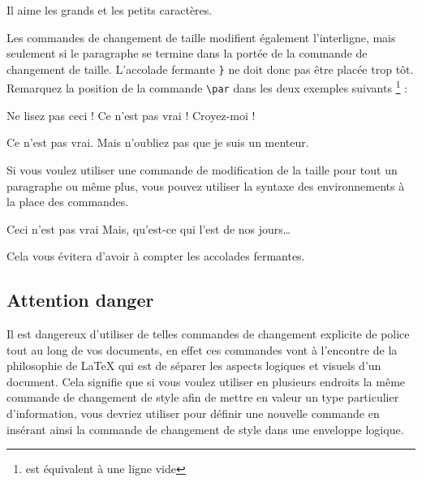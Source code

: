 \begin{example}
Il aime les  {\LARGE grands et
{\small les petits}
caractères}.
\end{example}

Les commandes de changement de taille modifient également
l'interligne, mais seulement si le paragraphe se termine dans la
portée de la commande de changement de taille. L'accolade fermante
\verb|}| ne
doit donc pas être placée trop tôt. Remarquez la position de la
commande \verb|\par| dans les deux exemples suivants
\footnote{ est équivalent à une ligne vide} :

\begin{example}
{\Large Ne lisez pas ceci !
 Ce n'est pas vrai !
 Croyez-moi !\par}
\end{example}
\begin{example}
{\Large Ce n'est pas vrai. Mais
n'oubliez pas que je suis un
menteur.}\par
\end{example}

Si vous voulez utiliser une commande de modification de la taille pour
tout un paragraphe ou même plus, vous pouvez utiliser la syntaxe des
environnements à la place des commandes.

\begin{example}
\begin{Large} \raggedright
Ceci n'est pas vrai
Mais, qu'est-ce qui l'est
de nos jours\dots\par
\end{Large}
\end{example}

\noindent Cela vous évitera d'avoir à compter les accolades
fermantes.

\subsection{Attention danger}

Il est dangereux d'utiliser de telles commandes de changement
explicite de police tout au long de vos documents, en effet ces
commandes vont à l'encontre de la philosophie de \LaTeX{} qui est de
séparer les aspects logiques et visuels d'un document. Cela signifie
que si vous voulez utiliser en plusieurs endroits la même commande de
changement de style afin de mettre en valeur un type particulier
\vadjust{\pagebreak[3]}%
d'information, vous devriez utiliser  pour définir une
nouvelle commande en insérant ainsi la commande de changement de style
dans une enveloppe logique.

